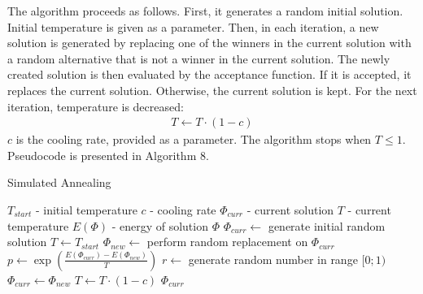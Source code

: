 The algorithm proceeds as follows. First, it generates a random initial solution. Initial temperature is given as a parameter. Then, in each iteration, a new solution is generated by replacing one of the winners in the current solution with a random alternative that is not a winner in the current solution. The newly created solution is then evaluated by the acceptance function. If it is accepted, it replaces the current solution. Otherwise, the current solution is kept. For the next iteration, temperature is decreased:
\begin{gather}
	T \gets T \cdot (1 - c)
\end{gather}
$c$ is the cooling rate, provided as a parameter. The algorithm stops when $T \leq 1$. Pseudocode is presented in Algorithm 8.

\begin{algorithm}
\caption{Simulated Annealing}\label{euclid}
\begin{algorithmic}[1]
		\State $T_{start}$ - initial temperature
		\State $c$ - cooling rate
		\State $\Phi_{curr}$ - current solution
		\State $T$ - current temperature
		\State $E(\Phi)$ - energy of solution $\Phi$
		\State $\Phi_{curr} \gets$ generate initial random solution
		\State $T \gets T_{start}$
			\State $\Phi_{new} \gets$ perform random replacement on $\Phi_{curr}$
			\State $p \gets \exp(\frac{E(\Phi_{curr})-E(\Phi_{new})}{T})$
			\State $r \gets$ generate random number in range $[0;1)$
				\State $\Phi_{curr} \gets \Phi_{new}$
			\EndIf
			\State $T \gets T \cdot (1 - c)$
		\EndWhile
		\State \Return $\Phi_{curr}$
	\EndProcedure
\end{algorithmic}
\end{algorithm}
